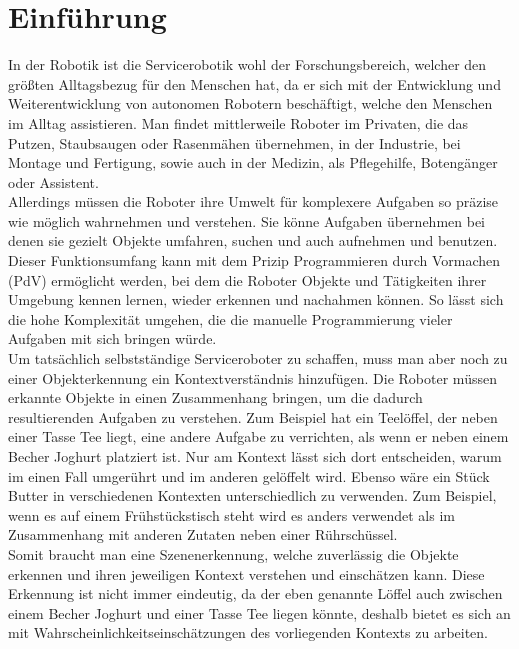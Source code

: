 \chapter{Einführung}\label{ch:einleitung}

In der Robotik ist die Servicerobotik wohl der Forschungsbereich, welcher den größten Alltagsbezug für den Menschen hat, da er sich mit der Entwicklung und 
Weiterentwicklung von autonomen Robotern beschäftigt, welche den Menschen im Alltag assistieren.  Man findet mittlerweile Roboter im Privaten, die das Putzen, Staubsaugen oder Rasenmähen übernehmen, in der Industrie, bei Montage und Fertigung, sowie auch in der Medizin, als Pflegehilfe, Botengänger oder Assistent.\smallskip\\
Allerdings müssen die Roboter ihre Umwelt für komplexere Aufgaben so präzise wie möglich wahrnehmen und verstehen. Sie könne Aufgaben übernehmen bei denen sie gezielt Objekte umfahren, suchen und auch aufnehmen und benutzen. Dieser Funktionsumfang kann mit dem Prizip Programmieren durch Vormachen (PdV) ermöglicht werden, bei dem die Roboter Objekte und Tätigkeiten ihrer Umgebung kennen lernen, wieder erkennen und nachahmen können. So lässt sich die hohe Komplexität umgehen, die die manuelle Programmierung vieler Aufgaben mit sich bringen würde.\smallskip\\
Um tatsächlich selbstständige Serviceroboter zu schaffen, muss man aber noch zu einer Objekterkennung ein Kontextverständnis hinzufügen. Die Roboter müssen erkannte Objekte in einen Zusammenhang bringen, um die dadurch resultierenden Aufgaben zu verstehen. Zum Beispiel hat ein Teelöffel, der neben einer Tasse Tee liegt, eine andere Aufgabe zu verrichten, als wenn er neben einem Becher Joghurt platziert ist. Nur am Kontext lässt sich dort entscheiden, warum im einen Fall umgerührt und im anderen gelöffelt wird. Ebenso wäre ein Stück Butter in verschiedenen Kontexten unterschiedlich zu verwenden. Zum Beispiel, wenn es auf einem Frühstückstisch steht wird es anders verwendet als im Zusammenhang mit anderen Zutaten neben einer Rührschüssel.\smallskip\\
Somit braucht man eine Szenenerkennung, welche zuverlässig die Objekte erkennen und ihren jeweiligen Kontext verstehen und einschätzen kann. Diese Erkennung ist nicht immer eindeutig, da der eben genannte Löffel auch zwischen einem Becher Joghurt und einer Tasse Tee liegen könnte, deshalb bietet es sich an mit Wahrscheinlichkeitseinschätzungen des vorliegenden Kontexts zu arbeiten.


